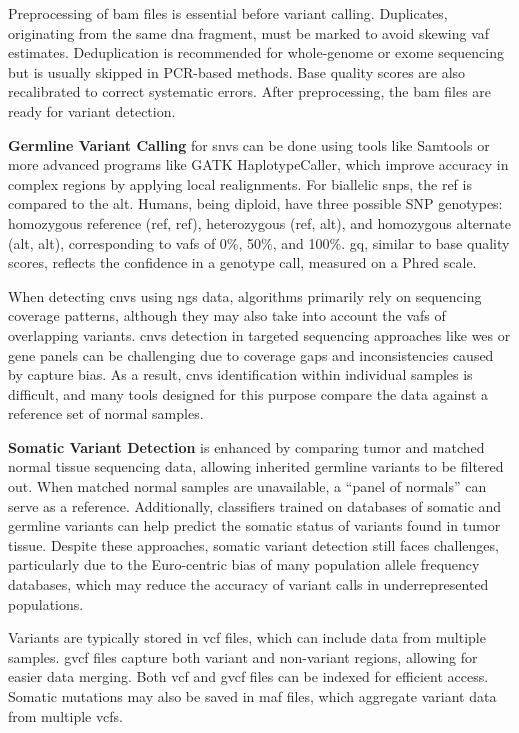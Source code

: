 Preprocessing of \ac{bam} files is essential before variant calling. Duplicates, originating from the same \ac{dna} fragment, must be marked to avoid skewing \ac{vaf} estimates. Deduplication is recommended for whole-genome or exome sequencing but is usually skipped in PCR-based methods. Base quality scores are also recalibrated to correct systematic errors. After preprocessing, the \ac{bam} files are ready for variant detection. \cite{Larson2023}

\textbf{Germline Variant Calling} for \ac{snvs} can be done using tools like Samtools or more advanced programs like GATK HaplotypeCaller, which improve accuracy in complex regions by applying local realignments. For biallelic \ac{snps}, the \ac{ref} is compared to the \ac{alt}. Humans, being diploid, have three possible SNP genotypes: homozygous reference (\ac{ref}, \ac{ref}), heterozygous (\ac{ref}, \ac{alt}), and homozygous alternate (\ac{alt}, \ac{alt}), corresponding to \ac{vaf}s of 0\%, 50\%, and 100\%. \ac{gq}, similar to base quality scores, reflects the confidence in a genotype call, measured on a Phred scale. \cite{Larson2023}

When detecting \ac{cnvs} using \ac{ngs} data, algorithms primarily rely on sequencing coverage patterns, although they may also take into account the \ac{vaf}s of overlapping variants. \ac{cnvs} detection in targeted sequencing approaches like \ac{wes} or gene panels can be challenging due to coverage gaps and inconsistencies caused by capture bias. As a result, \ac{cnvs} identification within individual samples is difficult, and many tools designed for this purpose compare the data against a reference set of normal samples. \cite{Larson2023}

\textbf{Somatic Variant Detection} is enhanced by comparing tumor and matched normal tissue sequencing data, allowing inherited germline variants to be filtered out. When matched normal samples are unavailable, a “panel of normals” can serve as a reference. Additionally, classifiers trained on databases of somatic and germline variants can help predict the somatic status of variants found in tumor tissue. Despite these approaches, somatic variant detection still faces challenges, particularly due to the Euro-centric bias of many population allele frequency databases, which may reduce the accuracy of variant calls in underrepresented populations. \cite{Larson2023}

Variants are typically stored in \ac{vcf} files, which can include data from multiple samples. \ac{gvcf} files capture both variant and non-variant regions, allowing for easier data merging. Both \ac{vcf} and \ac{gvcf} files can be indexed for efficient access. Somatic mutations may also be saved in \ac{maf} files, which aggregate variant data from multiple \ac{vcf}s. \cite{Larson2023}

